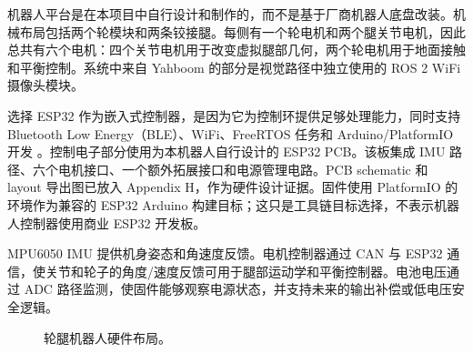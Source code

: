 \documentclass[12pt, a4paper]{article}
\begin{document}
机器人平台是在本项目中自行设计和制作的，而不是基于厂商机器人底盘改装。机械布局包括两个轮模块和两条铰接腿。每侧有一个轮电机和两个腿关节电机，因此总共有六个电机：四个关节电机用于改变虚拟腿部几何，两个轮电机用于地面接触和平衡控制。系统中来自 Yahboom 的部分是视觉路径中独立使用的 ROS 2 WiFi 摄像头模块。

选择 ESP32 作为嵌入式控制器，是因为它为控制环提供足够处理能力，同时支持 Bluetooth Low Energy（BLE）、WiFi、FreeRTOS 任务和 Arduino/PlatformIO 开发 \cite{espressif_freertos_idf,espressif_arduino_esp32,platformio_core_docs}。控制电子部分使用为本机器人自行设计的 ESP32 PCB。该板集成 IMU 路径、六个电机接口、一个额外拓展接口和电源管理电路。PCB schematic 和 layout 导出图已放入 Appendix H，作为硬件设计证据。固件使用 PlatformIO 的 \texttt{} 环境作为兼容的 ESP32 Arduino 构建目标；这只是工具链目标选择，不表示机器人控制器使用商业 ESP32 开发板。

MPU6050 IMU 提供机身姿态和角速度反馈。电机控制器通过 CAN 与 ESP32 通信，使关节和轮子的角度/速度反馈可用于腿部运动学和平衡控制器。电池电压通过 ADC 路径监测，使固件能够观察电源状态，并支持未来的输出补偿或低电压安全逻辑。

\begin{figure}[H]
    \centering
    \caption{轮腿机器人硬件布局。}
    \label{fig:hardware-layout}
\end{figure}
\end{document}
